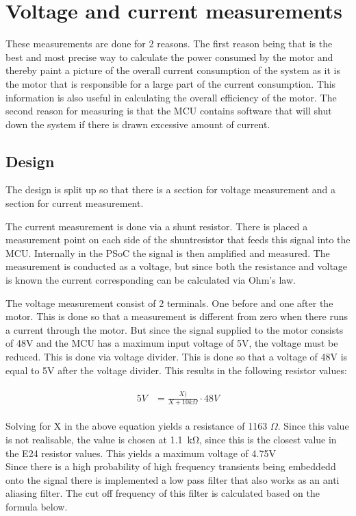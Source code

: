 \section{Voltage and current measurements}
\label{sec:measurements}
These measurements are done for 2 reasons. The first reason being that is the best and most precise way to calculate the power consumed by the motor and thereby paint a picture of the overall current consumption of the system as it is the motor that is responsible for a large part of the current consumption. This information is also useful in calculating the overall efficiency of the motor. The second reason for measuring is that the MCU contains software that will shut down the system if there is drawn excessive amount of current. 

\subsection{Design}
The design is split up so that there is a section for voltage measurement and a section for current measurement.

The current measurement is done via a shunt resistor. There is placed a measurement point on each side of the shuntresistor that feeds this signal into the MCU. Internally in the PSoC the signal is then amplified and measured. The measurement is conducted as a voltage, but since both the resistance and voltage is known the current corresponding can be calculated via Ohm's law.

The voltage measurement consist of 2 terminals. One before and one after the motor. This is done so that a measurement is different from zero when there runs a current through the motor. But since the signal supplied to the motor consists of 48V and the MCU has a maximum input voltage of 5V, the voltage must be reduced. This is done via voltage divider. This is done so that a voltage of 48V is equal to 5V after the voltage divider. This results in the following resistor values:

\begin{align}
	\begin{split}
		5V &= \frac{X)}{X+10k\Omega} \cdot 48V
	\end{split}
\end{align}

Solving for X in the above equation yields a resistance of 1163 $\Omega$. Since this value is not realisable, the value is chosen at \SI{1.1}{\kilo \ohm}, since this is the closest value in the E24 resistor values. This yields a maximum voltage of 4.75V \\
Since there is a high probability of high frequency transients being embeddedd onto the signal there is implemented a low pass filter that also works as an anti aliasing filter. The cut off frequency of this filter is calculated based on the formula below.


